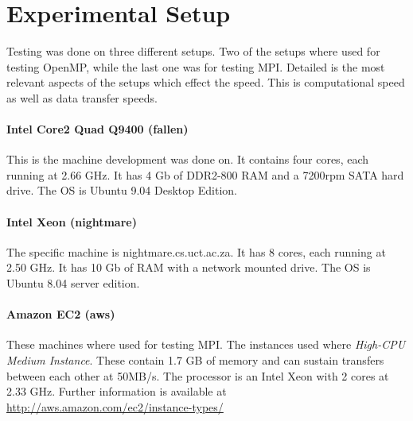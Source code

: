 \documentclass{article}
\begin{document}
\section{Experimental Setup}

Testing was done on three different setups. Two of the setups where used for
testing OpenMP, while the last one was for testing MPI. Detailed is the most
relevant aspects of the setups which effect the speed. This is computational
speed as well as data transfer speeds.

\paragraph{Intel Core2 Quad Q9400 (fallen)}
This is the machine development was done on. It contains four cores, each
running at 2.66 GHz. It has 4 Gb of DDR2-800 RAM and a 7200rpm SATA hard
drive. The OS is Ubuntu 9.04 Desktop Edition.

\paragraph{Intel Xeon (nightmare)} 
The specific machine is nightmare.cs.uct.ac.za. It has 8 cores, each running
at 2.50 GHz. It has 10 Gb of RAM with a network mounted drive. The OS is
Ubuntu 8.04 server edition.

\paragraph{Amazon EC2 (aws)}
These machines where used for testing MPI. The instances used where
\emph{High-CPU Medium Instance}. These contain 1.7 GB of memory and can
sustain transfers between each other at 50MB/s. The processor is an Intel Xeon
with 2 cores at 2.33 GHz. Further information is available at
\url{http://aws.amazon.com/ec2/instance-types/}
\end{document}
